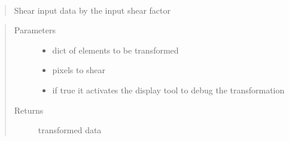 \documentclass[letterpaper,10pt,english]{sphinxmanual}
\begin{document}
\begin{fulllineitems}
\label{\detokenize{ida_lib.operations:ida_lib.operations.transforms.shear}}~\begin{quote}

Shear input data by the input shear factor
\end{quote}
\begin{quote}\begin{description}
\item[{Parameters}] \leavevmode\begin{itemize}
\item {} 
 \textendash{} dict of elements to be transformed

\item {} 
 \textendash{} pixels to shear

\item {} 
 \textendash{} if true it activates the display tool to debug the transformation

\end{itemize}

\item[{Returns}] \leavevmode
transformed data

\end{description}\end{quote}

\end{fulllineitems}

\end{document}
